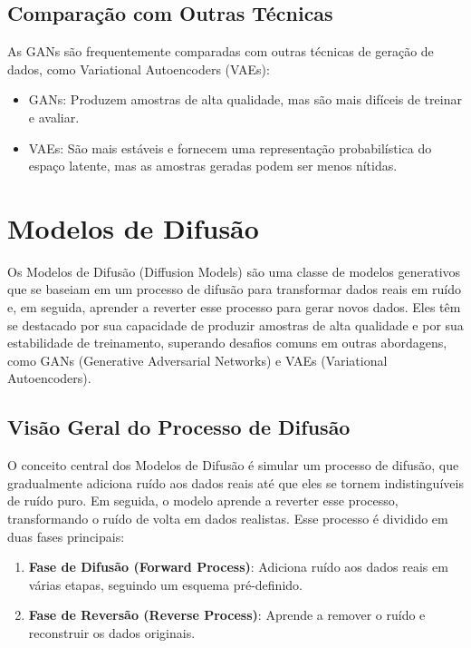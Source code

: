\documentclass[a4paper]{tufte-handout}
\begin{document}
\subsection{Comparação com Outras Técnicas}

As GANs são frequentemente comparadas com outras técnicas de geração de dados, como Variational Autoencoders (VAEs):
\begin{itemize}
    \item GANs: Produzem amostras de alta qualidade, mas são mais difíceis de treinar e avaliar.
    \item VAEs: São mais estáveis e fornecem uma representação probabilística do espaço latente, mas as amostras geradas podem ser menos nítidas.
\end{itemize}

\section{Modelos de Difusão}

Os Modelos de Difusão (Diffusion Models) são uma classe de modelos generativos que se baseiam em um processo de difusão para transformar dados reais em ruído e, em seguida, aprender a reverter esse processo para gerar novos dados. Eles têm se destacado por sua capacidade de produzir amostras de alta qualidade e por sua estabilidade de treinamento, superando desafios comuns em outras abordagens, como GANs (Generative Adversarial Networks) e VAEs (Variational Autoencoders).

\subsection{Visão Geral do Processo de Difusão}

O conceito central dos Modelos de Difusão é simular um processo de difusão, que gradualmente adiciona ruído aos dados reais até que eles se tornem indistinguíveis de ruído puro. Em seguida, o modelo aprende a reverter esse processo, transformando o ruído de volta em dados realistas. Esse processo é dividido em duas fases principais:
\begin{enumerate}
    \item \textbf{Fase de Difusão (Forward Process)}: Adiciona ruído aos dados reais em várias etapas, seguindo um esquema pré-definido.
    \item \textbf{Fase de Reversão (Reverse Process)}: Aprende a remover o ruído e reconstruir os dados originais.
\end{enumerate}
\end{document}
